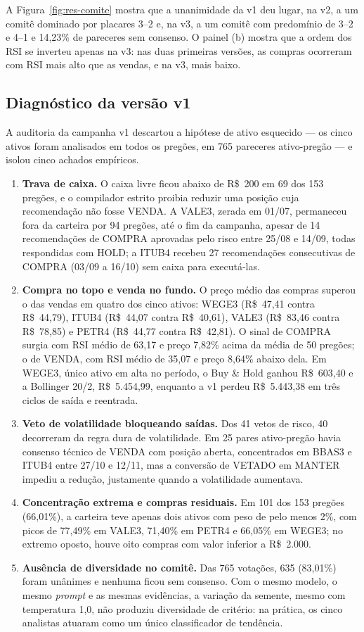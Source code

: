 A Figura~\ref{fig:res-comite} mostra que a unanimidade da v1 deu lugar, na v2, a um comitê dominado por placares 3--2 e, na v3, a um comitê com predomínio de 3--2 e 4--1 e 14,23\% de pareceres sem consenso. O painel (b) mostra que a ordem dos RSI se inverteu apenas na v3: nas duas primeiras versões, as compras ocorreram com RSI mais alto que as vendas, e na v3, mais baixo.

\subsection{Diagnóstico da versão v1}
\label{sec:res-v1}

A auditoria da campanha v1 descartou a hipótese de ativo esquecido --- os cinco ativos foram analisados em todos os pregões, em 765 pareceres ativo-pregão --- e isolou cinco achados empíricos.

\begin{enumerate}
    \item \textbf{Trava de caixa.} O caixa livre ficou abaixo de R\$~200 em 69 dos 153 pregões, e o compilador estrito proibia reduzir uma posição cuja recomendação não fosse VENDA. A VALE3, zerada em 01/07, permaneceu fora da carteira por 94 pregões, até o fim da campanha, apesar de 14 recomendações de COMPRA aprovadas pelo risco entre 25/08 e 14/09, todas respondidas com HOLD; a ITUB4 recebeu 27 recomendações consecutivas de COMPRA (03/09 a 16/10) sem caixa para executá-las.
    \item \textbf{Compra no topo e venda no fundo.} O preço médio das compras superou o das vendas em quatro dos cinco ativos: WEGE3 (R\$~47,41 contra R\$~44,79), ITUB4 (R\$~44,07 contra R\$~40,61), VALE3 (R\$~83,46 contra R\$~78,85) e PETR4 (R\$~44,77 contra R\$~42,81). O sinal de COMPRA surgia com RSI médio de 63,17 e preço 7,82\% acima da média de 50 pregões; o de VENDA, com RSI médio de 35,07 e preço 8,64\% abaixo dela. Em WEGE3, único ativo em alta no período, o Buy \& Hold ganhou R\$~603,40 e a Bollinger 20/2, R\$~5.454,99, enquanto a v1 perdeu R\$~5.443,38 em três ciclos de saída e reentrada.
    \item \textbf{Veto de volatilidade bloqueando saídas.} Dos 41 vetos de risco, 40 decorreram da regra dura de volatilidade. Em 25 pares ativo-pregão havia consenso técnico de VENDA com posição aberta, concentrados em BBAS3 e ITUB4 entre 27/10 e 12/11, mas a conversão de VETADO em MANTER impediu a redução, justamente quando a volatilidade aumentava.
    \item \textbf{Concentração extrema e compras residuais.} Em 101 dos 153 pregões (66,01\%), a carteira teve apenas dois ativos com peso de pelo menos 2\%, com picos de 77,49\% em VALE3, 71,40\% em PETR4 e 66,05\% em WEGE3; no extremo oposto, houve oito compras com valor inferior a R\$~2.000.
    \item \textbf{Ausência de diversidade no comitê.} Das 765 votações, 635 (83,01\%) foram unânimes e nenhuma ficou sem consenso. Com o mesmo modelo, o mesmo \textit{prompt} e as mesmas evidências, a variação da semente, mesmo com temperatura 1,0, não produziu diversidade de critério: na prática, os cinco analistas atuaram como um único classificador de tendência.
\end{enumerate}

